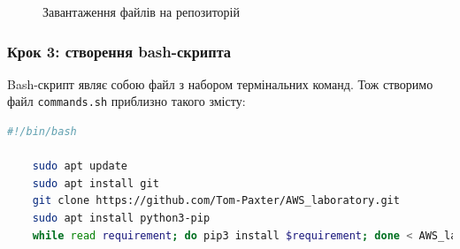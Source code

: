 \documentclass[a4paper,14pt]{extarticle} %
\begin{document}
\begin{figure}[H]
    \begin{minipage}[H]{1\linewidth}
    \end{minipage}
    \vfill
    \begin{minipage}[H]{1\linewidth}
        \vspace{0.2cm}
        \caption{Завантаження файлів на репозиторій}
        \label{fig:git}
    \end{minipage}
\end{figure}

\subsubsection*{Крок 3: створення bash-скрипта}

Bash-скрипт являє собою файл з набором термінальних команд. Тож створимо файл \texttt{commands.sh} приблизно такого змісту:

\begin{lstlisting}[language=bash, stringstyle=\small\ttfamily, emphstyle={[1]\small\ttfamily}]
    #!/bin/bash

    sudo apt update
    sudo apt install git
    git clone https://github.com/Tom-Paxter/AWS_laboratory.git
    sudo apt install python3-pip
    while read requirement; do pip3 install $requirement; done < AWS_laboratory/requirements.txt
    
\end{lstlisting}
\end{document}
